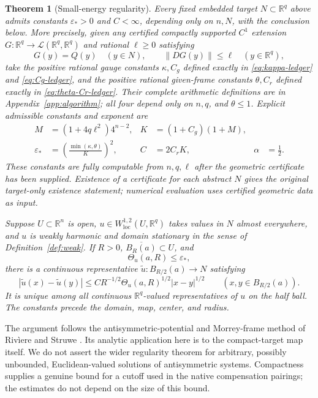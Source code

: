 \documentclass[reqno,11pt]{amsart}
\numberwithin{equation}{section}
\newtheorem{theorem}{Theorem}[section]
\theoremstyle{definition}
\theoremstyle{remark}
\newcommand{\R}{\mathbb R}
\newcommand{\loc}{\mathrm{loc}}
\newcommand{\Th}{\Theta}
\newcommand{\norm}[1]{\left\lVert#1\right\rVert}
\newcommand{\cl}[1]{\overline{#1}}
\begin{document}
\begin{theorem}[Small-energy regularity]\label{thm:main}
Every fixed embedded target $N\subset\R^q$ above admits constants
$\varepsilon_*>0$ and $C<\infty$, depending only on $n,N$, with the
conclusion below.
More precisely, given any certified compactly supported $C^1$ extension
$G:\R^q\to\mathcal L(\R^q,\R^q)$ and rational $\ell\geq0$ satisfying
\[
 G(y)=Q(y)\quad(y\in N),\qquad
 \norm{DG(y)}\leq\ell\quad(y\in\R^q),
\]
take the positive rational gauge constants $\kappa,C_g$ defined exactly
in \eqref{eq:kappa-ledger} and \eqref{eq:Cg-ledger}, and the positive
rational given-frame constants $\theta,C_r$ defined exactly in
\eqref{eq:theta-Cr-ledger}. Their complete arithmetic definitions are in
Appendix~\ref{app:algorithm}; all four depend only on $n,q$, and
$\theta\leq1$. Explicit admissible constants and exponent are
\begin{align}
 M&=(1+4q\ell^2)4^{n-2},& K&=(1+C_g)(1+M),\nonumber\\
 \varepsilon_*&=\left(\frac{\min(\kappa,\theta)}K\right)^2,&
 C&=2C_rK,& \alpha&=\frac12.\label{eq:main-explicit-constants}
\end{align}
These constants are fully computable from $n,q,\ell$ after the geometric
certificate has been supplied. Existence of a certificate for each abstract
$N$ gives the original target-only existence statement; numerical evaluation
uses certified geometric data as input.

Suppose $U\subset\R^n$ is open, $u\in W^{1,2}_{\loc}(U,\R^q)$ takes
values in $N$ almost everywhere, and $u$ is weakly harmonic and domain
stationary in the sense of Definition~\ref{def:weak}. If $R>0$,
$\cl{B_R(a)}\subset U$, and
\begin{equation}\label{eq:small-energy}
 \Th_u(a,R)\leq\varepsilon_*,
\end{equation}
there is a continuous representative
$\widetilde u:B_{R/2}(a)\longrightarrow N$ satisfying
\begin{equation}\label{eq:holder-main}
 |\widetilde u(x)-\widetilde u(y)|
 \leq C R^{-1/2}\Th_u(a,R)^{1/2}|x-y|^{1/2}
 \qquad(x,y\in B_{R/2}(a)).
\end{equation}
It is unique among all continuous $\R^q$-valued representatives of $u$
on the half ball. The constants precede the domain, map, center, and radius.
\end{theorem}

The argument follows the antisymmetric-potential and Morrey-frame method
of Riv\`iere and Struwe \cite{R,RS}. Its analytic application here is to the
compact-target map itself. We do not assert the wider regularity theorem
for arbitrary, possibly unbounded, Euclidean-valued solutions of
antisymmetric systems. Compactness supplies a genuine bound for a cutoff
used in the native compensation pairings; the estimates do not depend on
the size of this bound.
\end{document}
